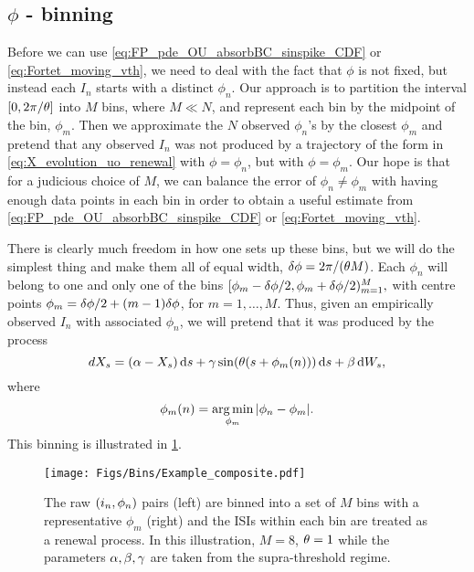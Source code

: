 \subsection{$\phi$ - binning}
Before we can use \cref{eq:FP_pde_OU_absorbBC_sinspike_CDF} or
\eqref{eq:Fortet_moving_vth}, we need to deal with the fact that $\phi$ is not
fixed, but instead each $I_n$ starts with a distinct $\phi_n$. Our approach is
to partition the interval $[0, 2 \pi/{ \theta}]$ into $M$ bins, where $M \ll N$, and
represent each bin by the midpoint of the bin, $\phi_m$. Then we approximate the
$N$ observed $\phi_n$'s by the closest $\phi_m$ and pretend that any observed
$I_n$ was not produced by a trajectory of the form in
\cref{eq:X_evolution_uo_renewal} with $\phi = \phi_n$, but with $\phi = \phi_m$.
Our hope is that for a judicious choice of $M$, we can balance the error of
$\phi_n \neq \phi_m$ with having enough data points in each bin in order to
obtain a useful estimate from \cref{eq:FP_pde_OU_absorbBC_sinspike_CDF} or
\eqref{eq:Fortet_moving_vth}.

There is clearly much freedom in how one sets up these bins, but we will do the
simplest thing and make them all of equal width, ${ \delta \phi } = 2 \pi / {({ \theta} M)}$.
Each $\phi_n$ will belong to one and only one of the bins $ [\phi_m - { \delta \phi }/2,
\phi_m + { \delta \phi }/2)_{m=1}^M, $ with centre points $ \phi_m = { \delta \phi } / 2 + (m-1)
{ \delta \phi }$, for $m = 1,\ldots, M$. Thus, given an empirically observed $I_n$ with
associated $\phi_n$, we will pretend that it was produced by the process $$ dX_s
= (\alpha - X_s) \, \mathrm{d} s  + {\gamma } \sin({ \theta} (s+\phi_m(n) ))
\, \mathrm{d} s
+ \beta \, \mathrm{d} W_s, $$ where $$ \phi_m(n)  = \argmin_{\phi_m} {| \phi_n - \phi_m|}.
$$ This binning is illustrated in \cref{fig:binning_visualized}.
\begin{figure}[ht]
\begin{center}
\texttt{[image: Figs/Bins/Example\_composite.pdf]}
  \end{center}
\caption[Phase binning illustration]{The raw $({ i_n}, \phi_n)$ pairs (left) are
binned into a set of $M$ bins with a representative $\phi_m$ (right) and the ISIs within each bin are treated
as a renewal process. In this illustration, $M=8$, ${ \theta} =
1$ while the parameters ${\alpha,\beta,{\gamma } }$ are taken from the
supra-threshold regime. }
\label{fig:binning_visualized} 
\end{figure}

